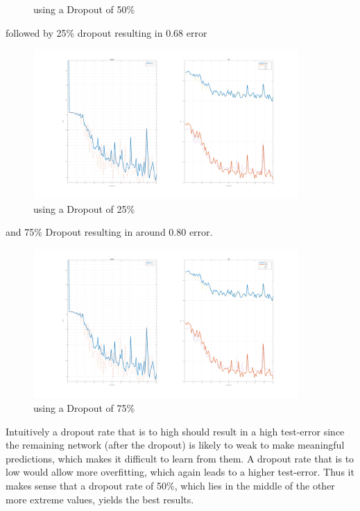 \documentclass[12pt]{article}
\begin{document}
\begin{enumerate}[a)]
\begin{figure}[H]
                \caption{using a Dropout of 50\%}
        \end{figure}
        followed by 25\% dropout resulting in 0.68 error 
        \begin{figure}[H]
            \centering
                \includegraphics[width=0.9\textwidth]{Plots/3_75_100.png}
                \caption{using a Dropout of 25\%}
        \end{figure}
        and 75\% Dropout resulting in around 0.80 error.
        \begin{figure}[H]
            \centering
                \includegraphics[width=0.9\textwidth]{Plots/3_75_100.png}
                \caption{using a Dropout of 75\%}
        \end{figure}
        Intuitively a dropout rate that is to high should result in a high test-error since the remaining network (after the dropout) is likely to weak to make meaningful predictions, which makes it difficult to learn from them. A dropout rate that is to low would allow more overfitting, which again leads to a higher test-error. Thus it makes sense that a dropout rate of 50\%, which lies in the middle of the other more extreme values, yields the best results.
\end{enumerate}
\end{document}
